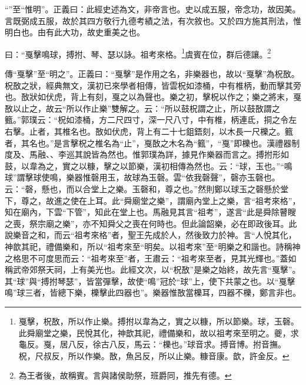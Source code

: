 {\noindent\shu{}\fzkt “”至“惟明”。正義曰：此經史述為文，非帝言也。史以成五服，帝念功，故因美。言既弼成五服，故於其四方敬行九德考績之法，有次敘也。又於四方施其刑法，惟明白也。由有此大功，故史重美之也。 \par}

曰：“戛擊鳴球，搏拊、琴、瑟以詠。祖考來格。\footnote{戛擊，柷敔，所以作止樂。搏拊以韋為之，實之以糠，所以節樂。球，玉磬。此舜廟堂之樂，民悅其化，神歆其祀，禮備樂和，故以祖考來至明之。夔，求龜反。戛，居八反，徐古八反，馬云：“櫟也。”球音求。搏音博。拊音撫。柷，尺叔反，所以作樂。敔，魚呂反，所以止樂。糠音康。歆，許金反。}虞賓在位，群后德讓。\footnote{為王者後，故稱賓。言與諸侯助祭，班爵同，推先有德。}


{\noindent\zhuan{}\fzbyks 傳“戛擊”至“明之”。正義曰：“戛擊”是作用之名，非樂器也，故以“戛擊”為柷敔。柷敔之狀，經典無文，漢初已來學者相傳，皆雲柷如漆桶，中有椎柄，動而擊其旁也。敔狀如伏虎，背上有刻，戛之以為聲也。樂之初，擊柷以作之；樂之將末，戛敔以止之，故云“所以作止樂”雙解之。云：“所以鼓柷謂之止，所以鼓敔謂之籈。”郭璞云：“柷如漆桶，方二尺四寸，深一尺八寸，中有椎，柄連氐，挏之令左右擊。止者，其椎名也。敔如伏虎，背上有二十七鉏鋙刻，以木長一尺櫟之。籈者，其名也。”是言擊柷之椎名為“止”，戛敔之木名為“籈”，“戛”即櫟也。漢禮器制度及、馬融、、李巡其說皆為然也。惟郭璞為詳，據見作樂器而言之。搏拊形如鼓，以韋為之，實之以糠，擊之以節樂，漢初相傳為然也。云：“球，玉也。”“鳴球”謂擊球使鳴，樂器惟磬用玉，故球為玉磬。雲“依我磬聲”，磬亦玉磬也。云：“磬，懸也，而以合堂上之樂。玉磬和，尊之也。”然則鄭以球玉之磬懸於堂下，尊之，故進之使在上耳。此“舜廟堂之樂”，謂廟內堂上之樂，言“祖考來格”，知在廟內，下雲“下管”，知此在堂上也。馬融見其言“祖考”，遂言“此是舜除瞽瞍之喪，祭宗廟之樂”，亦不知舜父之喪在何時也。但此論韶樂，必在即政後耳。此說樂音之和，而云“祖考來格”者，聖王先成於人，然後致力於神。言“人悅其化，神歆其祀，禮備樂和，所以“祖考來至“明矣。以祖考來”至“明樂之和諧也。詩稱神之格思不可度思而云：“祖考來至”者，王肅云：“祖考來至者，見其光輝也。”蓋如稱武帝郊祭天祠，上有美光也。此經文次，以“柷敔”是樂之始終，故先言“戛擊”。其“球”與“搏拊琴瑟”，皆當彈擊，故使“鳴”冠於“球”上，使下共蒙之也。以“戛擊鳴”球三者，皆總下樂，櫟擊此四器也”。樂器惟敔當櫟耳，四器不櫟，鄭言非也。 \par}


